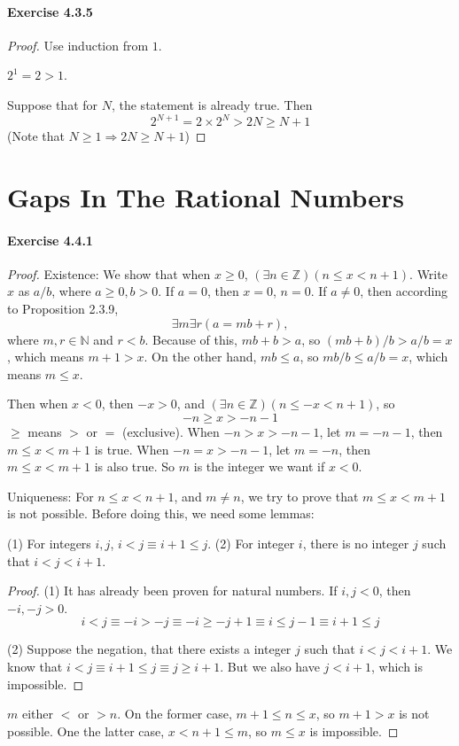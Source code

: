 \paragraph{Exercise 4.3.5} \label{exercise4.3.5}
\begin{proof}
Use induction from $1$.

$2^1 = 2 >1$.

Suppose that for $N$, the statement is already true. Then
\[
2^{N+1} = 2\times 2^N > 2N \geq N+1
\]
(Note that $N\geq 1 \Longrightarrow 2N \geq N+1$)
\end{proof}

\section{Gaps In The Rational Numbers}
\paragraph{Exercise 4.4.1} \label{exercise4.4.1}
\begin{proof}
Existence: We show that when $x \geq 0$, $(\exists n \in \mathbb{Z})(n \leq x < n+1)$. Write $x$ as $a/b$, 
where $a \geq 0,b>0$. If $a= 0$, then $x=0$, $n=0$. If $a\neq 0$, then according to Proposition 2.3.9, 
\[
\exists m \exists r(a = mb+r),
\]
where $m,r \in \mathbb{N}$ and $r < b$. Because of this, $mb+b >a$, so $(mb+b)/b>a/b=x$, which means $m+1>x$. 
On the other hand, $mb \leq a$, so $mb/b \leq a/b =x$, which means $m \leq x$.

Then when $x<0$, then $-x>0$, and $(\exists n \in \mathbb{Z})(n \leq -x < n+1)$, so 
\[
-n \geq x > -n -1
\]
$\geq$ means $>$ or $=$ (exclusive). When $-n > x >-n-1$, let $m=-n-1$, then $m \leq x < m+1$ is true. When 
$-n =x > -n-1$, let $m=-n$, then $m \leq x < m+1$ is also true. So $m$ is the integer we want if $x<0$.

Uniqueness:
For $n \leq x < n+1$, and $m \neq n$, we try to prove that $m \leq x<m+1$ is not possible. Before doing this, 
we need some lemmas:
\begin{lem}
(1) For integers $i,j$, $i<j \equiv i+1\leq j$.
(2) For integer $i$, there is no integer $j$ such that $i<j<i+1$.
\end{lem}
\begin{proof}
(1) It has already been proven for natural numbers. If $i,j<0$, then $-i,-j>0$.
\[
i<j \equiv -i>-j \equiv -i \geq -j+1 \equiv i \leq j-1 \equiv i+1 \leq j
\]

(2)
Suppose the negation, that there exists a integer $j$ such that $i<j<i+1$. We know that 
$i<j \equiv i+1 \leq j \equiv j \geq i+1$. But we also have $j<i+1$, which is impossible.
\end{proof}

$m$ either $<$ or $>n$. On the former case, $m+1\leq n\leq x$, so $m+1>x$ is not possible. One the latter case, 
$x<n+1\leq m$, so $m \leq x$ is impossible.
\end{proof}

